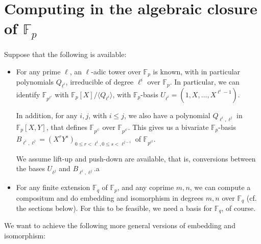 \documentclass{sig-alternate}
\def\F {\ensuremath{\mathbb{F}}}
\begin{document}

\section{Computing in the algebraic closure of $\F_p$}

Suppose that the following is available:
\begin{itemize}
\item For any prime $\ell$, an $\ell$-adic tower over $\F_p$ is known,
  with in particular polynomials $Q_{\ell^i}$, irreducible of degree
  $\ell^i$ over $\F_p$. In particular, we can identify  $\F_{p^{\ell^i}}$
  with $\F_p[X]/\langle Q_{\ell^i} \rangle$, with $\F_p$-basis
  $U_{\ell^i}=(1,X,\dots,X^{\ell^i-1})$. 

  In addition, for any $i,j$, with $i \le j$, we also have a
  polynomial $Q_{\ell^i,\ell^j}$ in $\F_p[X,Y]$, that defines
  $\F_{p^{\ell^j}}$ over $\F_{p^{\ell^j}}$. This gives us a bivariate
  $\F_p$-basis $B_{\ell^i,\ell^j}=(X^r Y^s)_{0 \le r < \ell^i, 0 \le s
    < \ell^{j-i}}$ of $\F_{p^{\ell^j}}$.
  
  We assume lift-up and push-down are available, that is, conversions
  between the bases $U_{\ell^j}$ and $B_{\ell^i,\ell^j}$.a

\item For any finite extension $\F_q$ of $\F_p$, and any coprime
  $m,n$, we can compute a compositum and do embedding and isomorphism
  in degrees $m,n$ over $\F_q$ (cf. the sections below). For this to
  be feasible, we need a basis for $\F_q$, of course.
\end{itemize}
We want to achieve the following more general versions of embedding
and isomorphism:
\end{document}
